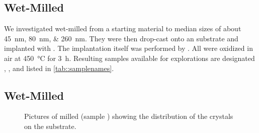 	\subsection{Wet-Milled \HPHT \Nds}\label{subsec::milled_hpht_nds}
		We investigated \nds wet-milled from a \HPHT starting material to median sizes of about \SIlist{45;80;260}{nm}.
		They were then drop-cast onto an \ir substrate and implanted with  . The implantation itself was performed by \rogalla.
		All \HPHT \nds were oxidized in air at \SI{450}{\celsius} for \SI{3}{\hour}. Resulting samples available for explorations are designated \hphtimpfortyfive, \hphtimpeighty, \hphtimptwosixty and listed in \autoref{tab::samplenames}.

	\subsection{Wet-Milled \CVD \Nds}\label{subsec::milled_nds}

		\begin{figure}[htp]
				\centering
			\caption[Distribution of \nds ontop of an \ir substrate]{Pictures of milled \nds (sample \insituH) showing the distribution of the \nd crystals on the \ir substrate.}
			 \label{fig::sem_millling}
		\end{figure}

